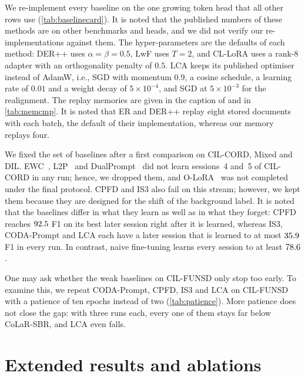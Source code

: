  We re-implement every baseline on the one growing token head that all other rows use (\cref{tab:baselinecard}). It is noted that the published numbers of these methods are on other benchmarks and heads, and we did not verify our re-implementations against them. The hyper-parameters are the defaults of each method: DER++ uses $\alpha{=}\beta{=}0.5$, LwF uses $T{=}2$, and CL-LoRA uses a rank-$8$ adapter with an orthogonality penalty of $0.5$. LCA keeps its published optimiser instead of AdamW, i.e., SGD with momentum $0.9$, a cosine schedule, a learning rate of $0.01$ and a weight decay of $5{\times}10^{-4}$, and SGD at $5{\times}10^{-3}$ for the realignment. The replay memories are given in the caption of  and in \cref{tab:memcmp}. It is noted that ER and DER++ replay eight stored documents with each batch, the default of their implementation, whereas our memory replays four.

 We fixed the set of baselines after a first comparison on CIL-CORD, Mixed and DIL. EWC~\citep{kirkpatrick2017ewc}, L2P~\citep{wang2022l2p} and DualPrompt~\citep{wang2022dualprompt} did not learn sessions~4 and~5 of CIL-CORD in any run; hence, we dropped them, and O-LoRA~\citep{wang2023olora} was not completed under the final protocol. CPFD and IS3 also fail on this stream; however, we kept them because they are designed for the shift of the background label. It is noted that the baselines differ in what they learn as well as in what they forget: CPFD reaches $92.5$ F1 on its best later session right after it is learned, whereas IS3, CODA-Prompt and LCA each have a later session that is learned to at most $35.9$ F1 in every run. In contrast, naive fine-tuning learns every session to at least $78.6$.

 One may ask whether the weak baselines on CIL-FUNSD only stop too early. To examine this, we repeat CODA-Prompt, CPFD, IS3 and LCA on CIL-FUNSD with a patience of ten epochs instead of two (\cref{tab:patience}). More patience does not close the gap: with three runs each, every one of them stays far below CoLaR-SBR, and LCA even falls.

\section{Extended results and ablations}
\label{app:results}

